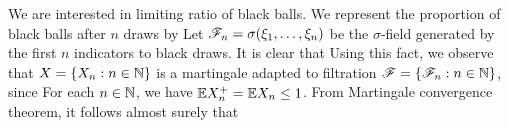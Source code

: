 \documentclass[a4paper,english,10pt]{article}
\begin{document}
We are interested in limiting ratio of black balls. 
We represent the proportion of black balls after $n$ draws by 
Let $\mathscr{F}_n = \sigma(\xi_1, \dots, \xi_n)$ be the $\sigma$-field generated by the first $n$ indicators to black draws. 
It is clear that 
Using this fact, we observe that $X = \{X_n: n \in \mathbb{N}\}$ is a martingale adapted to filtration $\mathscr{F} = \{\mathscr{F}_n: n \in \mathbb{N}\}$, since 
For each $n \in \mathbb{N}$, we have $\mathbb{E} X_n^+ = \mathbb{E} X_n \leq 1$. 
From Martingale convergence theorem, 
it follows almost surely that 
\end{document}
